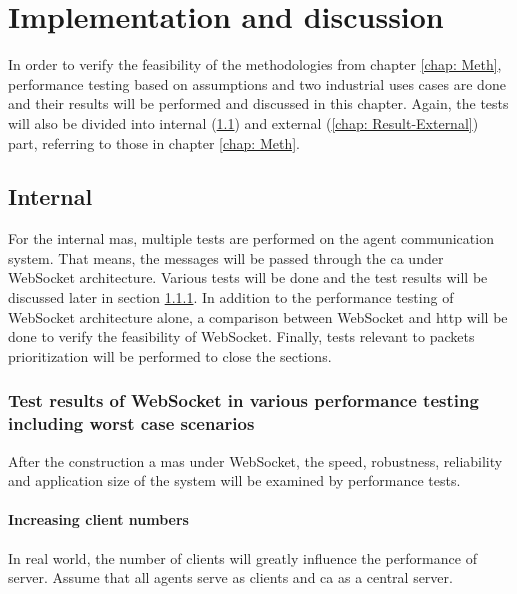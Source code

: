 \chapter{Implementation and discussion} \label{chap: Result}

In order to verify the feasibility of the methodologies from chapter \ref{chap: Meth}, 
performance testing based on assumptions and two industrial uses cases 
are done and their results will be performed and discussed in this chapter. 
Again, the tests will also be divided into internal (\ref{chap: Result-Internal}) 
and external (\ref{chap: Result-External}) part, referring to those in chapter \ref{chap: Meth}.

\section{Internal}\label{chap: Result-Internal}
For the internal \gls{mas}, multiple tests are performed on the agent 
communication system. That means, the messages 
will be passed through the \gls{ca} under WebSocket architecture. 
Various tests will be done and the test results will be discussed later in section 
\ref{chap: Result-WS}. 
In addition to the performance testing of WebSocket architecture alone, 
a comparison between WebSocket and \gls{http} will be done to verify the feasibility 
of WebSocket. 
Finally, tests relevant to packets prioritization will be performed to close 
the sections. 


\subsection{Test results of WebSocket in various performance testing including worst case scenarios} \label{chap: Result-WS}

After the construction a \gls{mas} under WebSocket, the speed, robustness, 
reliability and application size of the system will be examined by 
performance tests. 

\subsubsection{Increasing client numbers}
In real world, the number of clients will greatly influence the performance of 
server. Assume that all agents serve as clients and \gls{ca} as a central server. 
  

